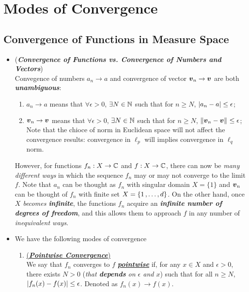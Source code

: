 \documentclass[11pt]{article}
\begin{document}
\section{Modes of Convergence}
\subsection{Convergence of Functions in Measure Space}
\begin{itemize}
\item \begin{remark} (\emph{\textbf{Convergence of Functions vs. Convergence of Numbers and Vectors}})  \\
Convegence of numbers $a_n \rightarrow a$ and convergence of vector $\boldsymbol{v}_n \rightarrow \boldsymbol{v}$ are both \emph{\textbf{unambiguous}}:
\begin{enumerate}
\item $a_n \rightarrow a$ means that $\forall \epsilon > 0$, $\exists N \in {\mathbb N}$ such that for $n \ge N$, $\left\lvert a_n - a \right\rvert \le \epsilon$;
\item $\boldsymbol{v}_n \rightarrow \boldsymbol{v}$ means that $\forall \epsilon > 0$, $\exists N \in {\mathbb N}$ such that for $n \ge N$, $\left\|\boldsymbol{v}_n - \boldsymbol{v}\right\|_{} \le \epsilon$; Note that the chioce of norm in Euclidean space will not affect the convergence results: convergence in $\ell_{p}$ will implies convergence in $\ell_{q}$ norm. 
\end{enumerate}

However, for functions $f_n: X \rightarrow {\mathbb C}$ and $f: X \rightarrow {\mathbb C}$, there can now be \emph{many different ways} in which the sequence $f_n$ may or may not converge to the limit $f$. Note that $a_n$ can be thought as $f_n$ with singular domain $X= \{1\}$ and $\boldsymbol{v}_n$ can be thought of $f_n$ with finite set $X = \left\{1 \,{,}\ldots{,}\, d\right\}$. On the other hand, once \emph{$X$ becomes \textbf{infinite}}, the functions $f_n$ acquire an \emph{\textbf{infinite number of degrees of freedom}}, and this allows them to approach $f$ in any number of \emph{inequivalent ways}.
\end{remark}

\item We have the following modes of convergence
\begin{enumerate}
\item \begin{definition}  \underline{(\emph{\textbf{Pointwise Convergence}})}\\
We say that $f_n$ converges to $f$ \underline{\emph{\textbf{pointwise}}} if, for any $x\in X$ and $\epsilon > 0$, there exists $N > 0$ (\emph{that \textbf{depends} on $\epsilon$ and $x$}) such that for all $n \ge N$, $\left\lvert f_n(x) - f(x) \right\rvert \le  \epsilon$. Denoted as $f_{n}(x)\rightarrow f(x)$.
\end{definition}


\end{enumerate}
\end{itemize}
\end{document}
